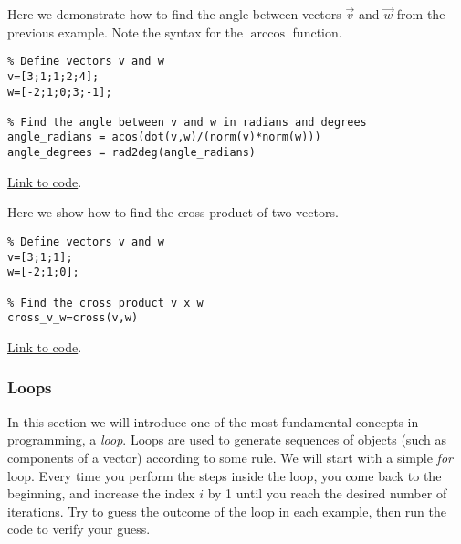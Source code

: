 \documentclass{ximera}
\begin{document}
\begin{example}\label{ex:angleInOctave}
    Here we demonstrate how to find the angle between vectors $\vec{v}$ and $\vec{w}$ from the previous example.  Note the syntax for the $\arccos{}$ function.
    \begin{explanation}
        \begin{verbatim}
% Define vectors v and w
v=[3;1;1;2;4];
w=[-2;1;0;3;-1];

% Find the angle between v and w in radians and degrees
angle_radians = acos(dot(v,w)/(norm(v)*norm(w)))
angle_degrees = rad2deg(angle_radians)
        \end{verbatim}

\href{https://sagecell.sagemath.org/?z=eJxVjM8KAiEQxu-C7zCXBY2WWreb7C16iSXC1mkTSkFFX79pyUPMYfj-_L4OzvhwHqHgkkNMUMB4C5WzMs2jHuiUPl01Z3Wae0XyqEfdD1-Hsw4ujtr5iUStL4Q75oro2wo4D9FYZ3zaDItrREycbe1biyYwS0jChizKvsqD8CG-RZG77VcpZSN-A0QQq0iJvyX5AVWtQWc=&lang=octave&interacts=eJyLjgUAARUAuQ==}{Link to code}.        
    \end{explanation}
\end{example}

\begin{template}\label{temp:cross}
Here we show how to find the cross product of two vectors.
\begin{verbatim}
% Define vectors v and w
v=[3;1;1];
w=[-2;1;0];

% Find the cross product v x w
cross_v_w=cross(v,w)
\end{verbatim}

\href{https://sagecell.sagemath.org/?z=eJxTVXBJTcvMS1UoS00uyS8qVihTSMxLUSjn5SqzjTa2NrQ2jLXm5Sq3jdY1AnIMQBxeLlUFt0ygopKMVIXkovziYoWCovyU0uQSoOYKkFawYHxZfLktmKVRplOuCQBmGSA1&lang=octave&interacts=eJyLjgUAARUAuQ==}{Link to code}.
\end{template}

\subsubsection*{Loops}
In this section we will introduce one of the most fundamental concepts in programming, a \emph{loop}.  Loops are used to generate sequences of objects (such as components of a vector) according to some rule.  We will start with a simple \emph{for} loop.  Every time you perform the steps inside the loop, you come back to the beginning, and increase the index $i$ by 1 until you reach the desired number of iterations.  Try to guess the outcome of the loop in each example, then run the code to verify your guess.
\end{document}
